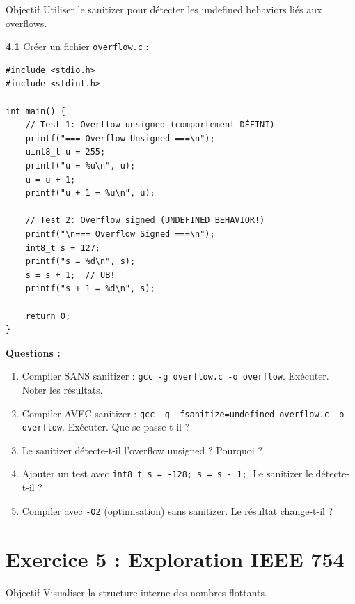 \documentclass[10pt,a4paper]{article}
\begin{document}
\begin{exercicebox}{Objectif}
Utiliser le sanitizer pour détecter les undefined behaviors liés aux overflows.
\end{exercicebox}

\textbf{4.1} Créer un fichier \texttt{overflow.c} :

\begin{lstlisting}
#include <stdio.h>
#include <stdint.h>

int main() {
    // Test 1: Overflow unsigned (comportement DÉFINI)
    printf("=== Overflow Unsigned ===\n");
    uint8_t u = 255;
    printf("u = %u\n", u);
    u = u + 1;
    printf("u + 1 = %u\n", u);
    
    // Test 2: Overflow signed (UNDEFINED BEHAVIOR!)
    printf("\n=== Overflow Signed ===\n");
    int8_t s = 127;
    printf("s = %d\n", s);
    s = s + 1;  // UB!
    printf("s + 1 = %d\n", s);
    
    return 0;
}
\end{lstlisting}

\textbf{Questions :}
\begin{enumerate}[label=\alph*)]
    \item Compiler SANS sanitizer : \texttt{gcc -g overflow.c -o overflow}. Exécuter. Noter les résultats.
    \item Compiler AVEC sanitizer : \texttt{gcc -g -fsanitize=undefined overflow.c -o overflow}. Exécuter. Que se passe-t-il ?
    \item Le sanitizer détecte-t-il l'overflow unsigned ? Pourquoi ?
    \item Ajouter un test avec \texttt{int8\_t s = -128; s = s - 1;}. Le sanitizer le détecte-t-il ?
    \item Compiler avec \texttt{-O2} (optimisation) sans sanitizer. Le résultat change-t-il ?
\end{enumerate}

\section{Exercice 5 : Exploration IEEE 754}

\begin{exercicebox}{Objectif}
Visualiser la structure interne des nombres flottants.
\end{exercicebox}
\end{document}
